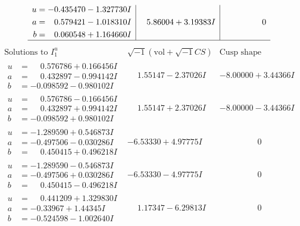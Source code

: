 \documentclass[1p]{elsarticle_modified}
\theoremstyle{definition}
\newcommand{\I}{\sqrt{-1}}
\begin{document}
$$\begin{array}{c|c|c}
\begin{aligned}
u &= -0.435470 - 1.327730 I \\
a &= \phantom{-}0.579421 - 1.018310 I \\
b &= \phantom{-}0.060548 + 1.164660 I\end{aligned}
 & \phantom{-}5.86004 + 3.19383 I & \phantom{-0.000000 } 0\\
 \hline 
 \end{array}$$\newpage$$\begin{array}{c|c|c}  
\text{Solutions to }I^u_{1}& \I (\text{vol} + \sqrt{-1}CS) & \text{Cusp shape}\\
 \hline 
\begin{aligned}
u &= \phantom{-}0.576786 + 0.166456 I \\
a &= \phantom{-}0.432897 - 0.994142 I \\
b &= -0.098592 - 0.980102 I\end{aligned}
 & \phantom{-}1.55147 - 2.37026 I & -8.00000 + 3.44366 I \\ \hline\begin{aligned}
u &= \phantom{-}0.576786 - 0.166456 I \\
a &= \phantom{-}0.432897 + 0.994142 I \\
b &= -0.098592 + 0.980102 I\end{aligned}
 & \phantom{-}1.55147 + 2.37026 I & -8.00000 - 3.44366 I \\ \hline\begin{aligned}
u &= -1.289590 + 0.546873 I \\
a &= -0.497506 - 0.030286 I \\
b &= \phantom{-}0.450415 + 0.496218 I\end{aligned}
 & -6.53330 + 4.97775 I & \phantom{-0.000000 } 0 \\ \hline\begin{aligned}
u &= -1.289590 - 0.546873 I \\
a &= -0.497506 + 0.030286 I \\
b &= \phantom{-}0.450415 - 0.496218 I\end{aligned}
 & -6.53330 - 4.97775 I & \phantom{-0.000000 } 0 \\ \hline\begin{aligned}
u &= \phantom{-}0.441209 + 1.329830 I \\
a &= -0.33967 + 1.44345 I \\
b &= -0.524598 - 1.002640 I\end{aligned}
 & \phantom{-}1.17347 - 6.29813 I & \phantom{-0.000000 } 0 \\ \hline\begin{aligned}

\end{aligned}
\end{array}$$
\end{document}

